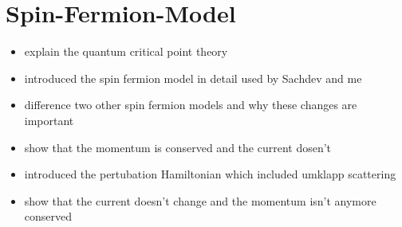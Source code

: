 %
%
%
\chapter{Spin-Fermion-Model}
\label{ch: spin fermion model}
%
%
%
\begin{itemize}
	\item explain the quantum critical point theory
	\item introduced the spin fermion model in detail used by Sachdev and me
	\item difference two other spin fermion models and why these changes are important
	\item show that the momentum is conserved and the current dosen't
	\item introduced the pertubation Hamiltonian which included umklapp scattering
	\item show that the current doesn't change and the momentum isn't anymore conserved
\end{itemize}